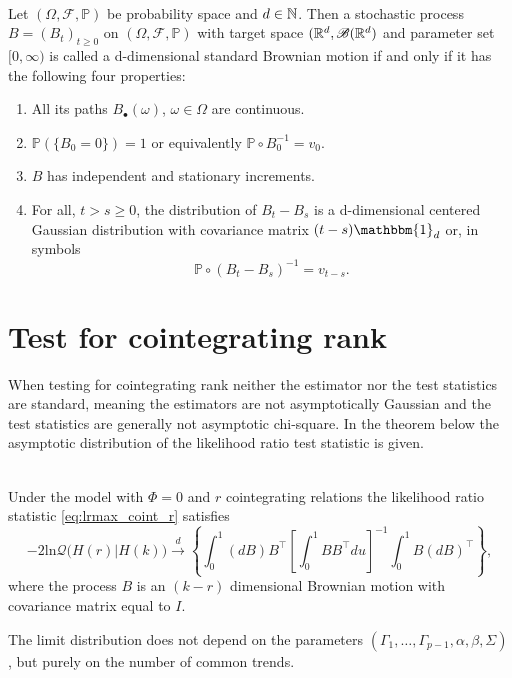 \begin{defi}\phantom{}\\
    Let $(\Omega, \mathscr{F}, \mathbb{P})$ be probability space and $d\in \mathbb{N}$. Then a stochastic process $B=(B_t)_{t\geq0}$ on $(\Omega, \mathscr{F}, \mathbb{P})$ with target space $(\mathbb{R}^d,\mathscr{B}(\mathbb{R}^d)$ and parameter set $[0,\infty)$ is called a d-dimensional standard Brownian motion if and only if it has the following four properties:
    
\renewcommand{\labelenumi}{\roman{enumi}.}
\begin{enumerate}
     \item All its paths $B_\bullet(\omega)$, $\omega\in\Omega$ are continuous.
     \item $\mathbb{P}(\{B_0=0\})=1$ or equivalently $\mathbb{P}\circ B_0^{-1}=v_0$.
     \item $B$ has independent and stationary increments.        
     \item  For all, $t > s \geq 0 $, the distribution of $B_t-B_s$ is a d-dimensional centered Gaussian distribution with covariance matrix $(t-s) \mathbbm{1}_d$ or, in symbols 
     \begin{equation*}
         \mathbb{P}\circ (B_t-B_s)^{-1}=v_{t-s}.
     \end{equation*}
\end{enumerate}
\end{defi}


\section{Test for cointegrating rank}
When testing for cointegrating rank neither the estimator nor the test statistics are standard, meaning the estimators are not asymptotically Gaussian and the test statistics are generally not asymptotic chi-square. In the theorem below the asymptotic distribution of the likelihood ratio test statistic is given.

\begin{thm}\phantom\\
    Under the model with $\Phi=0$ and $r$ cointegrating relations the likelihood ratio statistic \eqref{eq:lrmax_coint_r} satisfies
    \begin{equation*}
        -2 \text{ln}\mathcal{Q} \big( H(r)|H(k) \big) \overset{d}{\rightarrow} \left\{ \int_0^1 (dB)B^{\top} \left[\int_0^1 BB^\top du \right]^{-1} \int_0^1 B(dB)^\top \right\},
    \end{equation*}
    where the process $B$ is an $(k-r)$ dimensional Brownian motion with covariance matrix equal to $I.$
    \label{thm:asymptotic_distribution}
\end{thm}
\noindent The limit distribution does not depend on the parameters $(\Gamma_1,\ldots,\Gamma_{p-1},\alpha,\beta,\Sigma)$, but purely on the number of common trends.

